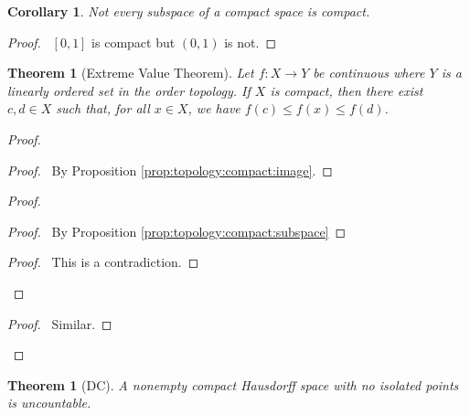 \documentclass{report}
\let\qed\relax
\newtheorem{thm}[lm]{Theorem}
\newtheorem{cor}{Corollary}[lm]
\theoremstyle{definition}
\begin{document}
\begin{cor}
  Not every subspace of a compact space is compact.
\end{cor}

\begin{proof}
  \pf\ $[0,1]$ is compact but $(0,1)$ is not. \qed
\end{proof}

  \begin{thm}[Extreme Value Theorem]
    Let $f : X \rightarrow Y$ be continuous where $Y$ is a linearly ordered set
    in the order topology. If $X$ is compact, then there exist $c, d \in X$
    such
    that, for all $x \in X$, we have $f(c) \leq f(x) \leq f(d)$.
  \end{thm}

  \begin{proof}
    \pf
    \begin{proof}
      \pf\ By Proposition \ref{prop:topology:compact:image}.
    \end{proof}
    \begin{proof}
      \begin{proof}
        \pf\ By Proposition \ref{prop:topology:compact:subspace}
      \end{proof}
      \qedstep
      \begin{proof}
        \pf\ This is a contradiction.
      \end{proof}
    \end{proof}
    \begin{proof}
      \pf\ Similar.
    \end{proof}
    \qed
  \end{proof}

  \begin{thm}[DC]
    A nonempty compact Hausdorff space with no isolated points is uncountable.
  \end{thm}
\end{document}

